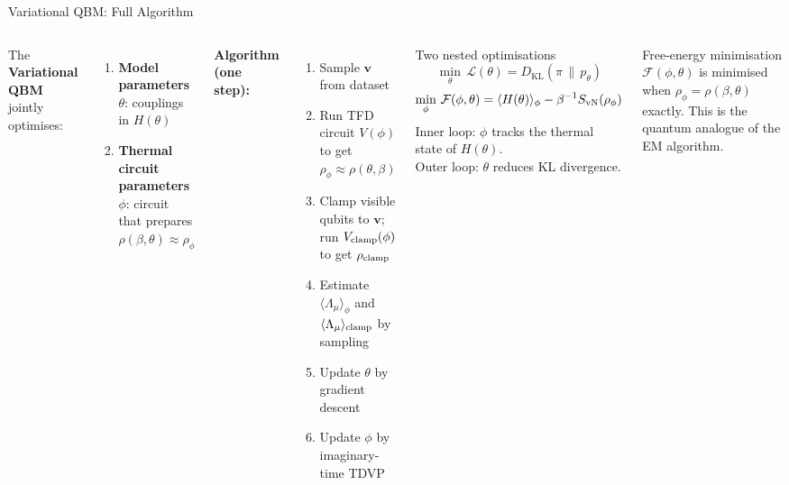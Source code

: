 \documentclass[aspectratio=169,10pt]{beamer}
\newcommand{\KL}[2]{D_{\mathrm{KL}}\!\left(#1\,\|\,#2\right)}
\begin{document}
\begin{frame}{Variational QBM: Full Algorithm}
  \begin{columns}[T]
      The \textbf{Variational QBM} jointly optimises:
      \begin{enumerate}
        \item \textbf{Model parameters} $\theta$:
              couplings in $H(\theta)$
        \item \textbf{Thermal circuit parameters} $\phi$:
              circuit that prepares $\rho(\beta,\theta)\approx
              \rho_\phi$
      \end{enumerate}

      \textbf{Algorithm (one step):}
      \begin{enumerate}
        \item Sample $\mathbf{v}$ from dataset
        \item Run TFD circuit $V(\phi)$ to get
              $\rho_\phi\approx\rho(\theta,\beta)$
        \item Clamp visible qubits to $\mathbf{v}$;
              run $V_{\rm clamp}(\phi)$ to get
              $\rho_{\rm clamp}$
        \item Estimate $\langle\Lambda_\mu\rangle_\phi$
              and $\langle\Lambda_\mu\rangle_{\rm clamp}$
              by sampling
        \item Update $\theta$ by gradient descent
        \item Update $\phi$ by imaginary-time TDVP
      \end{enumerate}
      \begin{alertblock}{Two nested optimisations}
        \[
          \min_\theta\,\mathcal{L}(\theta)
          = \KL{\pi}{p_\theta}
        \]
        \[
          \min_\phi\,\mathcal{F}(\phi,\theta)
          = \langle H(\theta)\rangle_\phi
            - \beta^{-1}S_{\rm vN}(\rho_\phi)
        \]
        Inner loop: $\phi$ tracks the thermal state of $H(\theta)$.\\
        Outer loop: $\theta$ reduces KL divergence.
      \end{alertblock}
      \vspace{0.2cm}
      \begin{block}{Free-energy minimisation}
        $\mathcal{F}(\phi,\theta)$ is minimised when
        $\rho_\phi = \rho(\beta,\theta)$ exactly.
        This is the quantum analogue of the EM algorithm.
      \end{block}
  \end{columns}
\end{frame}
\end{document}
